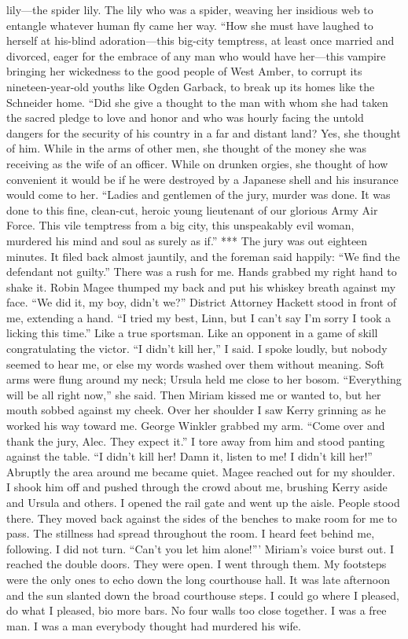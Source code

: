 \documentclass{novel}
\begin{document}
lily—the spider lily. The lily who was a spider, weaving her insidious web to entangle whatever human fly came her way. “How she must have laughed to herself at his-blind adoration—this big-city temptress, at least once married and divorced, eager for the embrace of any man who would have her—this vampire bringing her wickedness to the good people of West Amber, to corrupt its nineteen-year-old youths like Ogden Garback, to break up its homes like the Schneider home. “Did she give a thought to the man with whom she had taken the sacred pledge to love and honor and who was hourly facing the untold dangers for the security of his country in a far and distant land? Yes, she thought of him. While in the arms of other men, she thought of the money she was receiving as the wife of an officer. While on drunken orgies, she thought of how convenient it would be if he were destroyed by a Japanese shell and his insurance would come to her. “Ladies and gentlemen of the jury, murder was done. It was done to this fine, clean-cut, heroic young lieutenant of our glorious Army Air Force. This vile temptress from a big city, this unspeakably evil woman, murdered his mind and soul as surely as if.” *** The jury was out eighteen minutes. It filed back almost jauntily, and the foreman said happily: “We find the defendant not guilty.” There was a rush for me. Hands grabbed my right hand to shake it. Robin Magee thumped my back and put his whiskey breath against my face. “We did it, my boy, didn’t we?” District Attorney Hackett stood in front of me, extending a hand. “I tried my best, Linn, but I can’t say I’m sorry I took a licking this time.” Like a true sportsman. Like an opponent in a game of skill congratulating the victor. “I didn’t kill her,” I said. I spoke loudly, but nobody seemed to hear me, or else my words washed over them without meaning. Soft arms were flung around my neck; Ursula held me close to her bosom. “Everything will be all right now,” she said. Then Miriam kissed me or wanted to, but her mouth sobbed against my cheek. Over her shoulder I saw Kerry grinning as he worked his way toward me. George Winkler grabbed my arm. “Come over and thank the jury, Alec. They expect it.” I tore away from him and stood panting against the table. “I didn’t kill her! Damn it, listen to me! I didn’t kill her!” Abruptly the area around me became quiet. Magee reached out for my shoulder. I shook him off and pushed through the crowd about me, brushing Kerry aside and Ursula and others. I opened the rail gate and went up the aisle. People stood there. They moved back against the sides of the benches to make room for me to pass. The stillness had spread throughout the room. I heard feet behind me, following. I did not turn. “Can’t you let him alone!”’ Miriam’s voice burst out. I reached the double doors. They were open. I went through them. My footsteps were the only ones to echo down the long courthouse hall. It was late afternoon and the sun slanted down the broad courthouse steps. I could go where I pleased, do what I pleased, bio more bars. No four walls too close together. I was a free man. I was a man everybody thought had murdered his wife.
\end{document}
